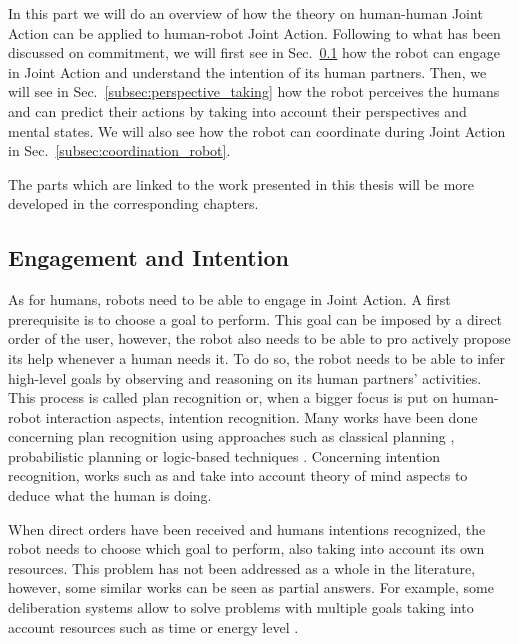 \documentclass[english,a4paper,11pt,twoside]{StyleThese}
\begin{document}
In this part we will do an overview of how the theory on human-human Joint Action can be applied to human-robot Joint Action. Following to what has been discussed on commitment, we will first see in Sec.~\ref{subsec:engagement} how the robot can engage in Joint Action and understand the intention of its human partners. Then, we will see in Sec.~\ref{subsec:perspective_taking} how the robot perceives the humans and can predict their actions by taking into account their perspectives and mental states. We will also see how the robot can coordinate during Joint Action in Sec.~\ref{subsec:coordination_robot}.

The parts which are linked to the work presented in this thesis will be more developed in the corresponding chapters.

\subsection{Engagement and Intention}

\label{subsec:engagement}

As for humans, robots need to be able to engage in Joint Action. A first prerequisite is to choose a goal to perform. This goal can be imposed by a direct order of the user, however, the robot also needs to be able to pro actively propose its help whenever a human needs it. To do so, the robot needs to be able to infer high-level goals by observing and reasoning on its human partners’ activities. This process is called plan recognition or, when a bigger focus is put on human-robot interaction aspects, intention recognition. Many works have been done concerning plan recognition using approaches such as classical planning \cite{ramirez2009plan}, probabilistic planning \cite{bui2003general} or logic-based techniques \cite{singla2011abductive}. Concerning intention recognition, works such as \cite{breazeal2009embodied} and \cite{baker2014modeling} take into account theory of mind aspects to deduce what the human is doing.

When direct orders have been received and humans intentions recognized, the robot needs to choose which goal to perform, also taking into account its own resources. This problem has not been addressed as a whole in the literature, however, some similar works can be seen as partial answers. For example, some deliberation systems allow to solve problems with multiple goals taking into account resources such as time \cite{georgeff1987reactive, ghallab1994representation, lemai2004interleaving} or energy level \cite{rabideau1999iterative}.
\end{document}
